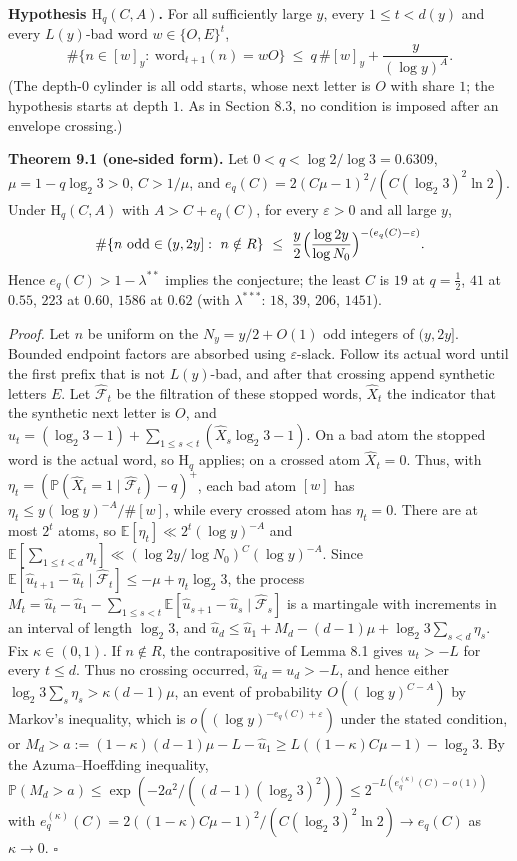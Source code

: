 \documentclass[11pt,a4paper]{article}
\begin{document}
\textbf{Hypothesis \(\mathrm H_q(C,A)\).} For all sufficiently large
\(y\), every \(1\le t<d(y)\) and every \(L(y)\)-bad word
\(w\in\{O,E\}^t\), \[
\#\{n\in[w]_y:\ \mathrm{word}_{t+1}(n)=wO\}\ \le\ q\,\#[w]_y+\frac{y}{(\log y)^{A}} .
\] (The depth-\(0\) cylinder is all odd starts, whose next letter is
\(O\) with share \(1\); the hypothesis starts at depth \(1\). As in
Section 8.3, no condition is imposed after an envelope crossing.)

\textbf{Theorem 9.1 (one-sided form).} Let \(0<q<\log 2/\log 3=0.6309\),
\(\mu=1-q\log_2 3>0\), \(C>1/\mu\), and
\(e_q(C)=2(C\mu-1)^2/(C(\log_2 3)^2\ln 2)\). Under \(\mathrm H_q(C,A)\)
with \(A>C+e_q(C)\), for every \(\varepsilon>0\) and all large \(y\), \[
\#\{n\ \text{odd}\in(y,2y]:\ n\notin R\}\ \le\ \frac y2\Bigl(\frac{\log 2y}{\log N_0}\Bigr)^{-(e_q(C)-\varepsilon)} .
\] Hence \(e_q(C)>1-\lambda^{**}\) implies the conjecture; the least
\(C\) is \(19\) at \(q=\tfrac12\), \(41\) at \(0.55\), \(223\) at
\(0.60\), \(1586\) at \(0.62\) (with \(\lambda^{***}\): \(18\), \(39\),
\(206\), \(1451\)).

\emph{Proof.} Let \(n\) be uniform on the \(N_y=y/2+O(1)\) odd integers
of \((y,2y]\). Bounded endpoint factors are absorbed using
\(\varepsilon\)-slack. Follow its actual word until the first prefix
that is not \(L(y)\)-bad, and after that crossing append synthetic
letters \(E\). Let \(\widehat{\mathcal F}_t\) be the filtration of these
stopped words, \(\widehat X_t\) the indicator that the synthetic next
letter is \(O\), and \(\widehat u_t=(\log_2 3-1)+
\sum_{1\le s<t}(\widehat X_s\log_2 3-1)\). On a bad atom the stopped
word is the actual word, so \(\mathrm H_q\) applies; on a crossed atom
\(\widehat X_t=0\). Thus, with
\(\eta_t=(\mathbb P(\widehat X_t=1\mid\widehat{\mathcal F}_t)-q)^+\),
each bad atom \([w]\) has \(\eta_t\le y(\log y)^{-A}/\#[w]\), while
every crossed atom has \(\eta_t=0\). There are at most \(2^t\) atoms, so
\(\mathbb E[\eta_t]\ll 2^t(\log y)^{-A}\) and
\(\mathbb E[\sum_{1\le t<d}\eta_t]\ll (\log 2y/\log N_0)^{C}(\log y)^{-A}\).
Since
\(\mathbb E[\widehat u_{t+1}-\widehat u_t\mid\widehat{\mathcal F}_t]
\le-\mu+\eta_t\log_2 3\), the process \(M_t=\widehat u_t-\widehat u_1-
\sum_{1\le s<t}\mathbb E[\widehat u_{s+1}-\widehat u_s
\mid\widehat{\mathcal F}_s]\) is a martingale with increments in an
interval of length \(\log_2 3\), and
\(\widehat u_d\le \widehat u_1+M_d-(d-1)\mu+
\log_2 3\sum_{s<d}\eta_s\). Fix \(\kappa\in(0,1)\). If \(n\notin R\),
the contrapositive of Lemma 8.1 gives \(u_t>-L\) for every \(t\le d\).
Thus no crossing occurred, \(\widehat u_d=u_d>-L\), and hence either
\(\log_2 3\sum_s\eta_s>\kappa(d-1)\mu\), an event of probability
\(O((\log y)^{C-A})\) by Markov's inequality, which is
\(o((\log y)^{-e_q(C)+\varepsilon})\) under the stated condition, or
\(M_d>a:=(1-\kappa)(d-1)\mu-L-\widehat u_1
\ge L((1-\kappa)C\mu-1)-\log_2 3\). By the Azuma--Hoeffding inequality,
\(\mathbb P(M_d>a)\le\exp(-2a^2/((d-1)(\log_2 3)^2))\le 2^{-L(e_q^{(\kappa)}(C)-o(1))}\)
with
\(e_q^{(\kappa)}(C)=2((1-\kappa)C\mu-1)^2/(C(\log_2 3)^2\ln 2)\to e_q(C)\)
as \(\kappa\to 0\). \(\square\)
\end{document}
